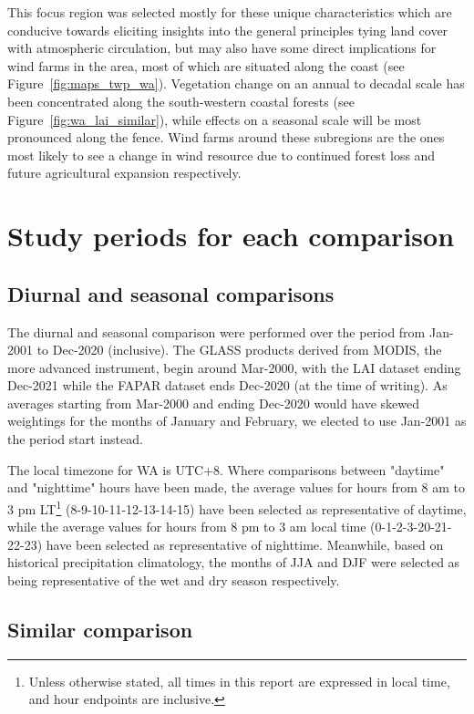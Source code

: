 This focus region was selected mostly for these unique characteristics which are conducive towards eliciting insights into the general principles tying land cover with atmospheric circulation, but may also have some direct implications for wind farms in the area, most of which are situated along the coast (see Figure~\ref{fig:maps_twp_wa}). Vegetation change on an annual to decadal scale has been concentrated along the south-western coastal forests (see Figure~\ref{fig:wa_lai_similar}), while effects on a seasonal scale will be most pronounced along the fence. Wind farms around these subregions are the ones most likely to see a change in wind resource due to continued forest loss and future agricultural expansion respectively.

\section{Study periods for each comparison}

\subsection{Diurnal and seasonal comparisons}
\label{ssec:method_diurnal_seasonal}

The diurnal and seasonal comparison were performed over the period from Jan-2001 to Dec-2020 (inclusive). The GLASS products derived from \ac{MODIS}, the more advanced instrument, begin around Mar-2000, with the \ac{LAI} dataset ending Dec-2021 while the \ac{FAPAR} dataset ends Dec-2020 (at the time of writing). As averages starting from Mar-2000 and ending Dec-2020 would have skewed weightings for the months of January and February, we elected to use Jan-2001 as the period start instead.

The local timezone for \ac{WA} is UTC+8. Where comparisons between "daytime" and "nighttime" hours have been made, the average values for hours from 8 am to 3 pm \ac{LT}\footnote{Unless otherwise stated, all times in this report are expressed in local time, and hour endpoints are inclusive.} (8-9-10-11-12-13-14-15) have been selected as representative of daytime, while the average values for hours from 8 pm to 3 am local time (0-1-2-3-20-21-22-23) have been selected as representative of nighttime. Meanwhile, based on historical precipitation climatology, the months of \ac{JJA} and \ac{DJF} were selected as being representative of the wet and dry season respectively.

\subsection{Similar comparison}

